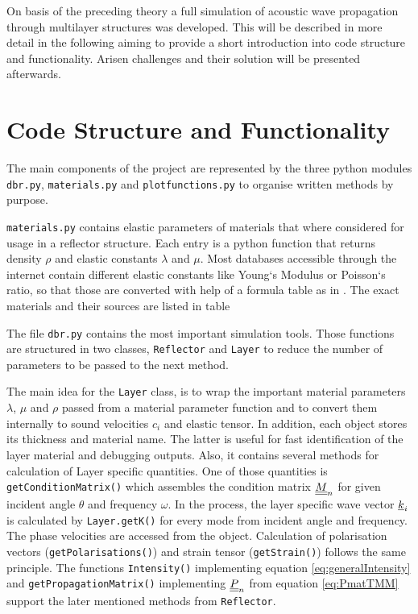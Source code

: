 On basis of the preceding theory a full simulation of acoustic wave propagation
through multilayer structures was developed. This will be
described in more detail in the following aiming to provide a short
introduction into code structure and functionality. Arisen challenges and their
solution will be presented afterwards.

\section{Code Structure and Functionality}
The main components of the project are represented by the three python modules
\texttt{dbr.py}, \texttt{materials.py} and \texttt{plotfunctions.py} to
organise written methods by purpose.

\texttt{materials.py} contains elastic parameters of materials that where
considered for usage in a reflector structure. Each entry is a python function
that returns density $\rho$ and elastic constants $\lambda$ and $\mu$. Most
databases accessible through the internet contain different elastic constants
like Young`s Modulus or Poisson`s ratio, so that those are converted with help
of a formula table as in \cite[30]{kundu2012ultrasonic} . The exact materials and their sources are listed in table

The file \texttt{dbr.py} contains the most important simulation tools. Those
functions are structured in two classes, \texttt{Reflector} and \texttt{Layer}
to reduce the number of parameters to be passed to the next method.

The main idea for the \texttt{Layer} class, is to wrap the important material
parameters $\lambda$, $\mu$ and $\rho$ passed from a material parameter
function and to convert them internally to sound velocities $c_i$ and elastic
tensor. In addition, each object stores its thickness and material name. The
latter is useful for fast identification of the layer material and debugging
outputs.
Also, it contains several methods for calculation of Layer specific
quantities. One of those quantities is \texttt{getConditionMatrix()} which
assembles the condition matrix $\underline{\underline{M}}_n$ for given incident angle
$\theta$ and frequency $\omega$. In the process, the layer specific wave vector
$\underline{k}_i$ is calculated by \texttt{Layer.getK()} for every mode from
incident angle and frequency. The phase velocities are accessed from the
object. Calculation of polarisation vectors (\texttt{getPolarisations()}) and
strain tensor (\texttt{getStrain()}) follows the same principle. The functions
\texttt{Intensity()} implementing equation \ref{eq:generalIntensity} and
\texttt{getPropagationMatrix()} implementing $\underline{\underline{P}}_n$ from equation
\ref{eq:PmatTMM} support the later mentioned methods from
\texttt{Reflector}.

